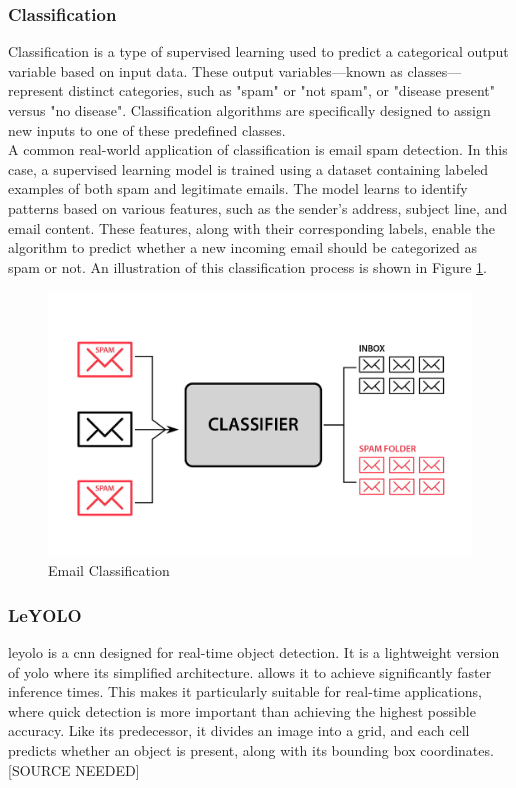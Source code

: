 \subsubsection*{Classification}
\label{subsubsec:classification}

Classification is a type of supervised learning used to predict a categorical output variable based on input data. These output variables—known as classes—represent distinct categories, such as "spam" or "not spam", or "disease present" versus "no disease". Classification algorithms are specifically designed to assign new inputs to one of these predefined classes. \cite{google:supervised-learning} \\

A common real-world application of classification is email spam detection. In this case, a supervised learning model is trained using a dataset containing labeled examples of both spam and legitimate emails. The model learns to identify patterns based on various features, such as the sender's address, subject line, and email content. These features, along with their corresponding labels, enable the algorithm to predict whether a new incoming email should be categorized as spam or not. An illustration of this classification process is shown in Figure \ref{fig:classification}. \cite{google:supervised-learning}

\begin{figure}[h!]
    \centering
    \includegraphics[width=0.75\linewidth]{figures/theory/classification.jpg}
    \caption[Email Classification]{Email Classification \cite{analytixlabs:classification}}
    \label{fig:classification}
\end{figure}

\subsubsection*{LeYOLO}
\gls{leyolo} is a \gls{cnn} designed for real-time object detection. It is a lightweight version of \gls{yolo} where its simplified architecture. allows it to achieve significantly faster inference times. This makes it particularly suitable for real-time applications, where quick detection is more important than achieving the highest possible accuracy. Like its predecessor, it divides an image into a grid, and each cell predicts whether an object is present, along with its bounding box coordinates.  [SOURCE NEEDED]\\


